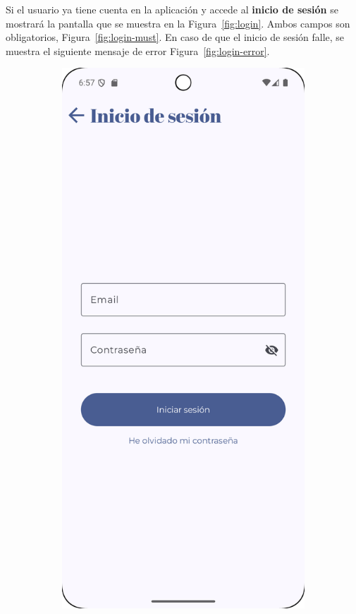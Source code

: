 \clearpage
Si el usuario ya tiene cuenta en la aplicación y accede al \textbf{inicio de sesión} se mostrará la pantalla que se muestra en la Figura~\ref{fig:login}. Ambos campos son obligatorios, Figura~\ref{fig:login-must}. En caso de que el inicio de sesión falle, se muestra el siguiente mensaje de error Figura~\ref{fig:login-error}.

\begin{figure}[H]
    \centering

    \begin{subfigure}[b]{0.3\textwidth}
      \includegraphics[width=\textwidth]{./img/manual/pinche_login.png}

\end{subfigure}
\end{figure}
